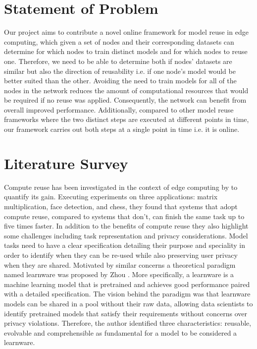 \documentclass{mprop}
\begin{document}
\section{Statement of Problem}

Our project aims to contribute a novel online framework for model reuse in edge computing, which given a set of nodes and their corresponding datasets can determine for which nodes to train distinct models and for which nodes to reuse one. Therefore, we need to be able to determine both if nodes' datasets are similar but also the direction of reusability i.e. if one node's model would be better suited than the other. Avoiding the need to train models for all of the nodes in the network reduces the amount of computational resources that would be required if no reuse was applied. Consequently, the network can benefit from overall improved performance. Additionally, compared to other model reuse frameworks where the two distinct steps are executed at different points in time, our framework carries out both steps at a single point in time i.e. it is online. 
 
\section{Literature Survey}

Compute reuse has been investigated in the context of edge computing by \cite{ComputeReuse} to quantify its gain. Executing experiments on three applications: matrix multiplication, face detection, and chess, they found that systems that adopt compute reuse, compared to systems that don't, can finish the same task up to five times faster. In addition to the benefits of compute reuse they also highlight some challenges including task representation and privacy considerations. Model tasks need to have a clear specification detailing their purpose and speciality in order to identify when they can be re-used while also preserving user privacy when they are shared. Motivated by similar concerns a theoretical paradigm named learnware was proposed by Zhou \cite{Learnware}. More specifically, a learnware is a machine learning model that is pretrained and achieves good performance paired with a detailed specification. The vision behind the paradigm was that learnware models can be shared in a pool without their raw data, allowing data scientists to identify pretrained models that satisfy their requirements without concerns over privacy violations. Therefore, the author identified three characteristics: reusable, evolvable and comprehensible as fundamental for a model to be considered a learnware.  
\end{document}
